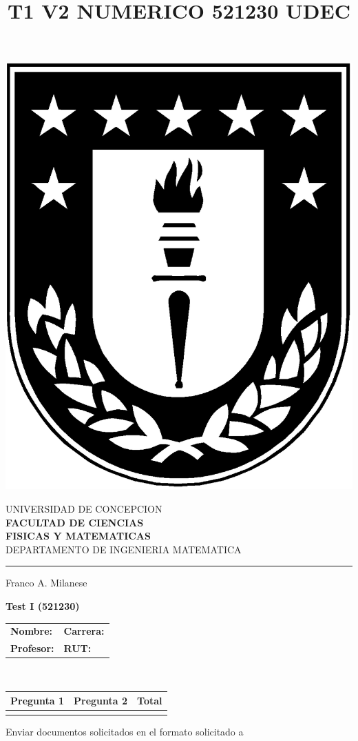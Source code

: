 \documentclass[11pt]{article}
\begin{document}
\title{T1 V2 NUMERICO 521230 UDEC}

\begin{minipage}{0.12\textwidth}
\includegraphics[width=\textwidth]{logoudec.eps}
\end{minipage}
\hspace{5mm}
\begin{minipage}{0.9\textwidth}
UNIVERSIDAD DE CONCEPCION\\
{\small\small\bf 
FACULTAD DE CIENCIAS\\ 
FISICAS Y MATEMATICAS}\\
DEPARTAMENTO DE INGENIERIA MATEMATICA\\
\rule{0.66\textwidth}{.5pt} Franco A. Milanese
\end{minipage}

\vspace{0.5cm}
\centerline{\bf Test I (521230)}
\begin{center}
 \begin{tabular}{p{}p{}}
	\textbf{Nombre:}   &\textbf{Carrera:}\\
	\textbf{Profesor:} & \textbf{ RUT:}
 \end{tabular}
 \\
 \vspace{0.2cm}
 \begin{tabular}{||p{2cm}|p{2cm}||p{2cm}||}
 \hline
 Pregunta 1 &  Pregunta 2  &     Total\\
 \hline

  \vspace{1.5cm} & &       \\
 \hline
 \end{tabular}
 \end{center}
 Enviar documentos solicitados en el formato solicitado a 
\end{document}

